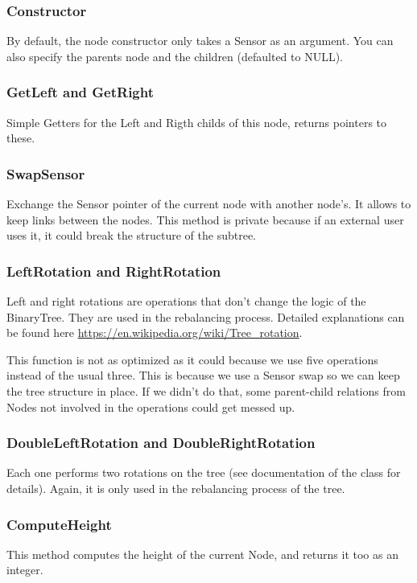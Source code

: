 \documentclass[10pt]{article}
\begin{document}
\subsubsection*{Constructor}
By default, the node constructor only takes a Sensor as an argument. You can also specify the parents node and the children (defaulted to NULL).

\subsubsection*{GetLeft and GetRight}
Simple Getters for the Left and Rigth childs of this node, returns pointers to these.

\subsubsection*{SwapSensor}
Exchange the Sensor pointer of the current node with another node's. It allows to keep links between the nodes. This method is private because if an external user uses it, it could break the structure of the subtree.

\subsubsection*{LeftRotation and RightRotation}
Left and right rotations are operations that don't change the logic of the BinaryTree. They are used in the rebalancing process. Detailed explanations can be found here \url{https://en.wikipedia.org/wiki/Tree_rotation}.

This function is not as optimized as it could because we use five operations instead of the usual three. This is because we use a Sensor swap so we can keep the tree structure in place. If we didn't do that, some parent-child relations from Nodes not involved in the operations could get messed up.

\subsubsection*{DoubleLeftRotation and DoubleRightRotation}
Each one performs two rotations on the tree (see documentation of the class for details). Again, it is only used in the rebalancing process of the tree.

\subsubsection*{ComputeHeight}
This method computes the height of the current Node, and returns it too as an integer.
\end{document}
